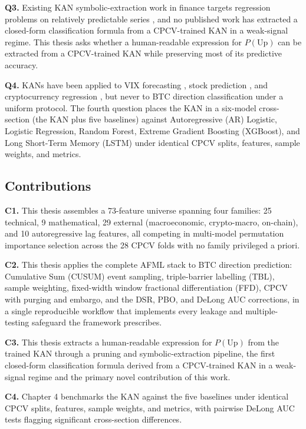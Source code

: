 \textbf{Q3.} Existing KAN symbolic-extraction work in finance targets regression problems on relatively predictable series \citep{cho_lee_kim_2025, oad_kasper_2025, gao_decokan_2025}, and no published work has extracted a closed-form classification formula from a CPCV-trained KAN in a weak-signal regime. This thesis asks whether a human-readable expression for $P(\text{Up})$ can be extracted from a CPCV-trained KAN while preserving most of its predictive accuracy.

\textbf{Q4.} KANs have been applied to VIX forecasting \citep{cho_lee_kim_2025}, stock prediction \citep{oad_kasper_2025}, and cryptocurrency regression \citep{gao_decokan_2025}, but never to BTC direction classification under a uniform protocol. The fourth question places the KAN in a six-model cross-section (the KAN plus five baselines) against Autoregressive (AR) Logistic, Logistic Regression, Random Forest, Extreme Gradient Boosting (XGBoost), and Long Short-Term Memory (LSTM) under identical CPCV splits, features, sample weights, and metrics.


\subsection{Contributions}\label{subsec:contributions}

\textbf{C1.} This thesis assembles a 73-feature universe spanning four families: 25 technical, 9 mathematical, 29 external (macroeconomic, crypto-macro, on-chain), and 10 autoregressive lag features, all competing in multi-model permutation importance selection across the 28 CPCV folds with no family privileged a priori.

\textbf{C2.} This thesis applies the complete AFML stack to BTC direction prediction: Cumulative Sum (CUSUM) event sampling, triple-barrier labelling (TBL), sample weighting, fixed-width window fractional differentiation (FFD), CPCV with purging and embargo, and the DSR, PBO, and DeLong AUC corrections, in a single reproducible workflow that implements every leakage and multiple-testing safeguard the framework prescribes.

\textbf{C3.} This thesis extracts a human-readable expression for $P(\text{Up})$ from the trained KAN through a pruning and symbolic-extraction pipeline, the first closed-form classification formula derived from a CPCV-trained KAN in a weak-signal regime and the primary novel contribution of this work.

\textbf{C4.} Chapter 4 benchmarks the KAN against the five baselines under identical CPCV splits, features, sample weights, and metrics, with pairwise DeLong AUC tests flagging significant cross-section differences.